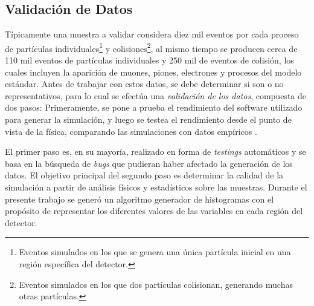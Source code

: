 
\subsection{Validación de Datos}

Típicamente una muestra a validar considera diez mil eventos por cada proceso de partículas individuales\footnote{Eventos simulados en los que se genera una única partícula inicial en una región específica del detector.} y colisiones\footnote{Eventos simulados en los que dos partículas colisionan, generando muchas otras partículas.}, al mismo tiempo se producen cerca de 110 mil eventos de partículas individuales y 250 mil de eventos de colisión, los cuales incluyen la aparición de muones, piones, electrones y procesos del modelo estándar. 
%
Antes de trabajar con estos datos, se debe determinar si son o no representativos, para lo cual se efectúa una \textit{validación de los datos}, compuesta de dos pasos: Primeramente, se pone a prueba el rendimiento del software utilizado para generar la simulación, y luego se testea el rendimiento desde el punto de vista de la física, comparando las simulaciones con datos empíricos \cite{Marshall2010}. 
%

El primer paso es, en su mayoría, realizado en forma de \emph{testings} automáticos y se basa en la búsqueda de \emph{bugs} que pudieran haber afectado la generación de los datos. 
%
El objetivo principal del segundo paso es determinar la calidad de la simulación a partir de análisis físicos y estadísticos sobre las muestras. Durante el presente trabajo se generó un algoritmo generador de histogramas con el propósito de representar los diferentes valores de las variables en cada región del detector.







